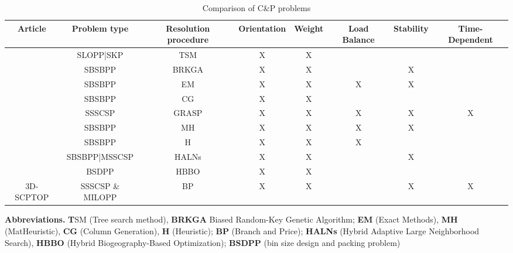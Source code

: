 \begin{table}
  \begin{adjustbox}{width=\textwidth}
    \begin{tabular}{|c|c|c|c|c|c|c|c|} \hline
      Article                           & Problem type     & Resolution procedure & Orientation & Weight & Load Balance & Stability & Time-Dependent \\
      \hline
      \autocite{Zhu2012AProblem}        & SLOPP|SKP        & TSM                  & X           & X      &              &           &               \\ \hline
      \autocite{Goncalves2013AProblems} & SBSBPP           & BRKGA                & X           & X      &              & X         &               \\ \hline
      \autocite{2016Paquay}             & SBSBPP           & EM                   & X           & X      & X            & X         &               \\ \hline
      \autocite{Mahvash2018}            & SBSBPP           & CG                   & X           & X      &              &           &               \\ \hline \autocite{Alonso2020AConstraints}& SSSCSP& GRASP& X& X& X& X&X\\ \hline
      \autocite{Tresca2022}             & SBSBPP           & MH                   & X           & X      & X            & X         &               \\ \hline
      \autocite{Harrath2022}
                                        & SBSBPP           & H                    & X           & X      & X            &           &               \\ \hline
      \autocite{Li2022}                 & SBSBPP|MSSCSP    & HALNs                & X           & X      &              & X         &               \\
      \hline
      \autocite{Chen2023}               & BSDPP            & HBBO                 & X           & X      &              &           &               \\
      \hline
      3D-SCPTOP                         & SSSCSP \& MILOPP & BP                   & X           & X      &              & X         & X             \\ \hline
    \end{tabular}
  \end{adjustbox}
  \begin{tablenotes}
    \scriptsize
    \item  \textbf{Abbreviations.}  \textbf{T}SM (Tree search method), \textbf{BRKGA} Biased Random-Key Genetic Algorithm; \textbf{EM} (Exact Methods), \textbf{MH} (MatHeuristic), \textbf{CG} (Column Generation), \textbf{H} (Heuristic); \textbf{BP} (Branch and Price); \textbf{HALNs} (Hybrid Adaptive Large Neighborhood Search), \textbf{HBBO} (Hybrid Biogeography-Based Optimization); \textbf{BSDPP} (bin size design and packing problem)
  \end{tablenotes}
  \label{tab:my_label}
  \caption{Comparison of C\&P problems}
\end{table}

